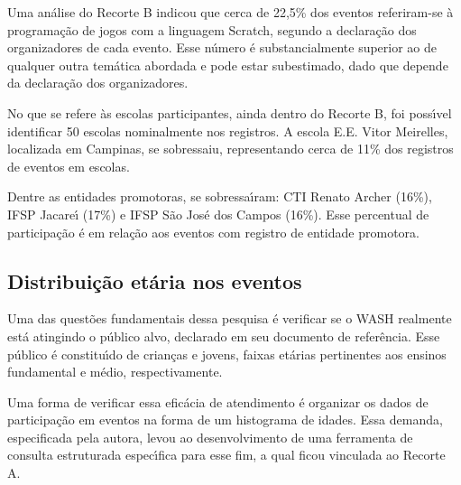 \documentclass[
12pt,		%
openright,	%
twoside,  %
a4paper,			%
chapter=TITLE,		%
english,			%
french,				%
spanish,			%
brazil				%
]{USPSC-classe/USPSC}
\begin{document}
Uma an\'alise do Recorte B indicou que cerca de 22,5\% dos eventos referiram-se \`a programa\c{c}\~ao de jogos com a linguagem Scratch, segundo a declara\c{c}\~ao dos organizadores de cada evento. Esse n\'umero \'e substancialmente superior ao de qualquer outra tem\'atica abordada e pode estar subestimado, dado que depende da declara\c{c}\~ao dos organizadores.









No que se refere \`as escolas participantes, ainda dentro do Recorte B, foi poss\'{\i}vel identificar 50 escolas nominalmente nos registros. A escola E.E. Vitor Meirelles,  localizada em Campinas, se sobressaiu, representando cerca de 11\% dos registros de eventos em escolas.









Dentre as entidades promotoras, se sobressa\'{\i}ram: CTI Renato Archer (16\%), IFSP Jacare\'{\i} (17\%) e IFSP S\~ao Jos\'e dos Campos (16\%). Esse percentual de participa\c{c}\~ao \'e em rela\c{c}\~ao aos eventos com registro de entidade promotora.









\subsection[Distribui\c{c}\~ao et\'aria nos eventos]{Distribui\c{c}\~ao et\'aria nos eventos}\label{Distribui\c{c}\~ao et\'aria nos eventos}
Uma das quest\~oes fundamentais dessa pesquisa \'e verificar se o WASH realmente est\'a atingindo o p\'ublico alvo, declarado em seu documento de refer\^encia. Esse p\'ublico \'e constitu\'{\i}do de crian\c{c}as e jovens, faixas et\'arias pertinentes aos ensinos fundamental e m\'edio, respectivamente.









Uma forma de verificar essa efic\'acia de atendimento \'e organizar os dados de participa\c{c}\~ao em eventos na forma de um histograma de idades. Essa demanda, especificada pela autora, levou ao desenvolvimento de uma ferramenta de consulta estruturada espec\'{\i}fica para esse fim, a qual ficou vinculada ao Recorte A.
\end{document}
